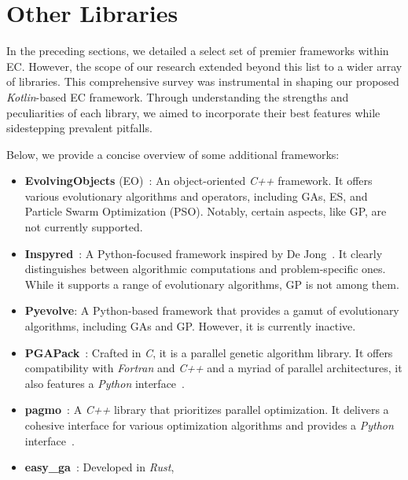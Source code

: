 \section{Other Libraries}
\label{sec:sota:other}
  In the preceding sections, we detailed a select set of premier frameworks 
  within EC.
  However, the scope of our research extended beyond this list to a wider array 
  of libraries.
  This comprehensive survey was instrumental in shaping our proposed 
  \textit{Kotlin}-based EC framework.
  Through understanding the strengths and peculiarities of each library, we 
  aimed to incorporate their best features while sidestepping prevalent 
  pitfalls.

  Below, we provide a concise overview of some additional frameworks:

  \begin{itemize}
    \item \textbf{EvolvingObjects} 
      (EO)~\autocite{EvolvingObjectsWelcomeEvolving}: An object-oriented 
      \textit{C++} framework.
      It offers various evolutionary algorithms and operators, including GAs, 
      ES, and Particle Swarm Optimization (PSO).
      Notably, certain aspects, like GP, are not currently supported.
    \item \textbf{Inspyred}~\autocite{InspyredBioinspiredAlgorithms}: A 
      Python-focused framework inspired by 
      De Jong~\autocite{dejongEvolutionaryComputationUnified2006}.
      It clearly distinguishes between algorithmic computations and 
      problem-specific ones.
      While it supports a range of evolutionary algorithms, GP is not among 
      them.
    \item \textbf{Pyevolve}: A Python-based framework that provides a gamut of 
      evolutionary algorithms, including GAs and GP.
      However, it is currently inactive.
    \item \textbf{PGAPack}~\autocite{SchlatterbeckPgapackParallel}: Crafted in 
      \textit{C}, it is a parallel genetic algorithm library.
      It offers compatibility with \textit{Fortran} and \textit{C++} and 
      a myriad of parallel architectures, it also features a \textit{Python}
      interface~\autocite{SchlatterbeckPgapyPythona}.
    \item \textbf{pagmo}~\autocite{Pagmo2023}: A \textit{C++} library that 
      prioritizes parallel optimization.
      It delivers a cohesive interface for various optimization algorithms and 
      provides a \textit{Python} interface~\autocite{Pygmo2023}.
    \item \textbf{easy\_ga}~\autocite{EasyGaSrc}: Developed in \textit{Rust}, 

\end{itemize}
